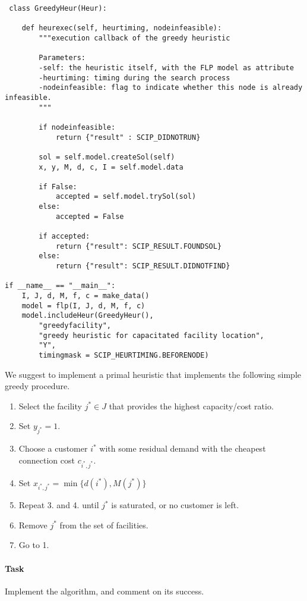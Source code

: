 \documentclass[a4paper,10pt]{article}
\begin{document}
\begin{lstlisting}
 class GreedyHeur(Heur):

    def heurexec(self, heurtiming, nodeinfeasible):
        """execution callback of the greedy heuristic

        Parameters:
        -self: the heuristic itself, with the FLP model as attribute
        -heurtiming: timing during the search process
        -nodeinfeasible: flag to indicate whether this node is already infeasible.
        """

        if nodeinfeasible:
            return {"result" : SCIP_DIDNOTRUN}

        sol = self.model.createSol(self)
        x, y, M, d, c, I = self.model.data

        if False:
            accepted = self.model.trySol(sol)
        else:
            accepted = False

        if accepted:
            return {"result": SCIP_RESULT.FOUNDSOL}
        else:
            return {"result": SCIP_RESULT.DIDNOTFIND}

if __name__ == "__main__":
    I, J, d, M, f, c = make_data()
    model = flp(I, J, d, M, f, c)
    model.includeHeur(GreedyHeur(),
        "greedyfacility",
        "greedy heuristic for capacitated facility location",
        "Y",
        timingmask = SCIP_HEURTIMING.BEFORENODE)
\end{lstlisting}

We suggest to implement a primal heuristic that implements
the following simple greedy procedure.

\begin{enumerate}
    \item Select the facility $j^{*} \in J$ that provides
    the highest capacity/cost ratio.
    \item Set $y_{j^{*}} = 1$.
    \item Choose a customer $i^{*}$ with some residual demand
    with the cheapest connection cost $c_{i^{*}, j^{*}}$.
    \item Set $x_{i^{*},j^{*}} = \min\{d(i^{*}), M(j^{*})\}$
    \item Repeat 3. and 4. until $j^{*}$ is saturated,
    or no customer is left.
    \item Remove $j^{*}$ from the set of facilities.
    \item Go to 1.
\end{enumerate}

\paragraph{Task}
Implement the algorithm, and comment on its success.
\end{document}
